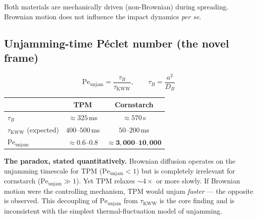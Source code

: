 \documentclass[11pt,letterpaper]{article}
\newcommand{\taukww}{\tau_{\mathrm{KWW}}}
\newcommand{\taub}{\tau_{B}}
\newcommand{\peunj}{\mathrm{Pe}_{\mathrm{unjam}}}
\newcommand{\DB}{D_B}
\begin{document}
Both materials are mechanically driven (non-Brownian) during spreading.
Brownian motion does not influence the impact dynamics \emph{per se}.

\subsection{Unjamming-time Péclet number (the novel frame)}

\begin{equation}
  \peunj = \frac{\taub}{\taukww}, \qquad
  \taub = \frac{a^2}{\DB}
  \label{eq:Pe_unjam}
\end{equation}

\begin{center}
\begin{tabular}{lcc}
  \toprule
  & TPM & Cornstarch \\
  \midrule
  $\taub$ & ${\approx}325$\,ms & ${\approx}570$\,s \\
  $\taukww$ (expected) & $400$--$500$\,ms & $50$--$200$\,ms \\
  $\peunj$ & $\mathbf{{\approx}0.6}$--$\mathbf{0.8}$ & $\mathbf{{\approx}3{,}000}$--$\mathbf{10{,}000}$ \\
  \bottomrule
\end{tabular}
\end{center}

\begin{intuitionbox}
\textbf{The paradox, stated quantitatively.}
Brownian diffusion operates on the unjamming timescale for TPM
($\peunj < 1$) but is completely irrelevant for cornstarch ($\peunj \gg 1$).
Yet TPM relaxes ${\sim}4\times$ or more slowly. If Brownian motion were
the controlling mechanism, TPM would unjam \emph{faster} --- the opposite
is observed. This decoupling of $\peunj$ from $\taukww$ is the core finding
and is inconsistent with the simplest thermal-fluctuation model of unjamming.
\end{intuitionbox}
\end{document}
